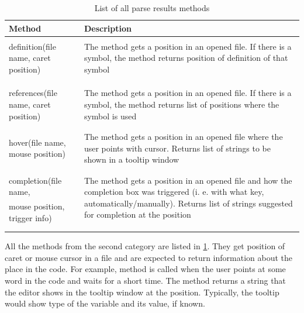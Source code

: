 \begin{table}
	\centering
	\begin{tabular}{ll}
		
		\toprule
		Method & Description \\ \midrule
		& \multirow{3}{8cm}{The method gets a position in an opened file. If there is a symbol, the method returns position of definition of that symbol} \\
		definition(file name, caret position) &  \\
		& \\
		& \\
		& \multirow{3}{8cm}{The method gets a position in an opened file. If there is a symbol, the method returns list of positions where the symbol is used}\\
		references(file name, caret position) & \\
		& \\
		& \\
		& \multirow{3}{8cm}{The method gets a position in an opened file where the user points with cursor. Returns list of strings to be shown in a tooltip window}\\
		hover(file name, mouse position)& \\
		& \\
		& \\
		& \multirow{3}{8cm}{The method gets a position in an opened file and how the completion box was triggered (i. e. with what key, automatically/manually). Returns list of strings suggested for completion at the position}\\
		completion(file name,& \\
		mouse position, trigger info)& \\
		& \\
		& \\ \bottomrule
	\end{tabular}
	
	\caption{List of all parse results methods}
	\label{parse_results}
\end{table}

All the methods from the second category are listed in \cref{parse_results}. They get position of caret or mouse cursor in a file and are expected to return information about the place in the code. For example, method  is called when the user points at some word in the code and waits for a short time. The method returns a string that the editor shows in the tooltip window at the position. Typically, the tooltip would show type of the variable and its value, if known.

